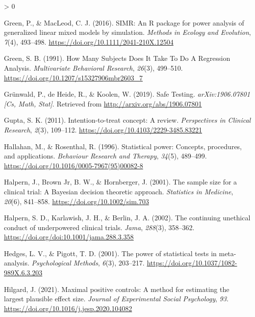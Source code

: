 \documentclass[
  english,
  ,jou, a4paper,floatsintext]{apa6}
\newlength{\cslhangindent}
\newenvironment{CSLReferences}[2] %
 {%
  \setlength{\parindent}{0pt}
  \ifodd #1 \everypar{\setlength{\hangindent}{\cslhangindent}}\ignorespaces\fi
  \ifnum #2 > 0
  \setlength{\parskip}{#2\baselineskip}
  \fi
 }%
 {}
\begin{document}
\begin{CSLReferences}{1}{0}
\leavevmode\hypertarget{ref-green_simr_2016}{}%
Green, P., \& MacLeod, C. J. (2016). {SIMR}: An {R} package for power analysis of generalized linear mixed models by simulation. \emph{Methods in Ecology and Evolution}, \emph{7}(4), 493--498. \url{https://doi.org/10.1111/2041-210X.12504}

\leavevmode\hypertarget{ref-green_how_1991}{}%
Green, S. B. (1991). How {Many Subjects Does It Take To Do A Regression Analysis}. \emph{Multivariate Behavioral Research}, \emph{26}(3), 499--510. \url{https://doi.org/10.1207/s15327906mbr2603_7}

\leavevmode\hypertarget{ref-grunwald_safe_2019}{}%
Grünwald, P., de Heide, R., \& Koolen, W. (2019). Safe {Testing}. \emph{arXiv:1906.07801 {[}Cs, Math, Stat{]}}. Retrieved from \url{http://arxiv.org/abs/1906.07801}

\leavevmode\hypertarget{ref-gupta_intention_2011}{}%
Gupta, S. K. (2011). Intention-to-treat concept: A review. \emph{Perspectives in Clinical Research}, \emph{2}(3), 109--112. \url{https://doi.org/10.4103/2229-3485.83221}

\leavevmode\hypertarget{ref-hallahan_statistical_1996}{}%
Hallahan, M., \& Rosenthal, R. (1996). Statistical power: Concepts, procedures, and applications. \emph{Behaviour Research and Therapy}, \emph{34}(5), 489--499. \url{https://doi.org/10.1016/0005-7967(95)00082-8}

\leavevmode\hypertarget{ref-halpern_sample_2001}{}%
Halpern, J., Brown Jr, B. W., \& Hornberger, J. (2001). The sample size for a clinical trial: A {Bayesian} decision theoretic approach. \emph{Statistics in Medicine}, \emph{20}(6), 841--858. \url{https://doi.org/10.1002/sim.703}

\leavevmode\hypertarget{ref-halpern_continuing_2002}{}%
Halpern, S. D., Karlawish, J. H., \& Berlin, J. A. (2002). The continuing unethical conduct of underpowered clinical trials. \emph{Jama}, \emph{288}(3), 358--362. \url{https://doi.org/doi:10.1001/jama.288.3.358}

\leavevmode\hypertarget{ref-hedges_power_2001}{}%
Hedges, L. V., \& Pigott, T. D. (2001). The power of statistical tests in meta-analysis. \emph{Psychological Methods}, \emph{6}(3), 203--217. \url{https://doi.org/10.1037/1082-989X.6.3.203}

\leavevmode\hypertarget{ref-hilgard_maximal_2021}{}%
Hilgard, J. (2021). Maximal positive controls: A method for estimating the largest plausible effect size. \emph{Journal of Experimental Social Psychology}, \emph{93}. \url{https://doi.org/10.1016/j.jesp.2020.104082}


\end{CSLReferences}
\end{document}
